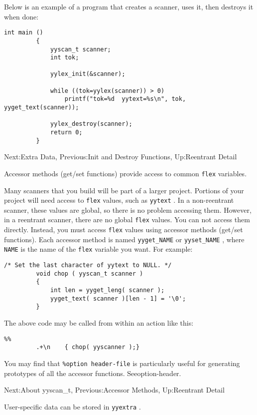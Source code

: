 \documentclass[openany,oneside]{book}
\begin{document}
Below is an example of a program that creates a scanner, uses it, then destroys
it when done:
\begin{verbatim}
int main ()
         {
             yyscan_t scanner;
             int tok;
     
             yylex_init(&scanner);
     
             while ((tok=yylex(scanner)) > 0)
                 printf("tok=%d  yytext=%s\n", tok, yyget_text(scanner));
     
             yylex_destroy(scanner);
             return 0;
         }
\end{verbatim}



Next:Extra Data,
Previous:Init and Destroy Functions,
Up:Reentrant Detail

Accessor methods (get/set functions) provide access to common \verb`flex` variables.

Many scanners that you build will be part of a larger project. Portions
of your project will need access to \verb`flex` values, such as \verb`yytext` .  In a non-reentrant scanner, these values are global, so
there is no problem accessing them. However, in a reentrant scanner, there are no
global \verb`flex` values. You can not access them directly.  Instead,
you must access \verb`flex` values using accessor methods (get/set
functions). Each accessor method is named \verb`yyget_NAME` or \verb`yyset_NAME` , where \verb`NAME` is the name of the \verb`flex` variable you want. For example:


\begin{verbatim}
/* Set the last character of yytext to NULL. */
         void chop ( yyscan_t scanner )
         {
             int len = yyget_leng( scanner );
             yyget_text( scanner )[len - 1] = '\0';
         }
\end{verbatim}


The above code may be called from within an action like this:
\begin{verbatim}
%%
         .+\n    { chop( yyscanner );}
\end{verbatim}


You may find that \verb`%option header-file` is particularly useful for generating
prototypes of all the accessor functions. Seeoption-header.


Next:About yyscan\_{}t,
Previous:Accessor Methods,
Up:Reentrant Detail

User-specific data can be stored in \verb`yyextra` .
\end{document}
